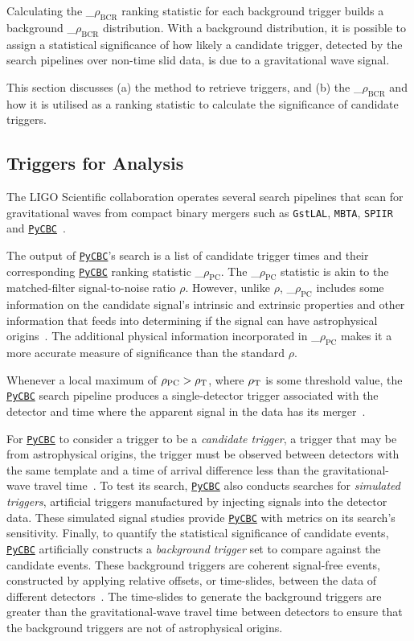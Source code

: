 \documentclass[%
 nofootinbib,
 amsmath,amssymb,
 aps,
 twocolumn
]{revtex4-2}
\newcommand{\pycbc}{{\sc \href{https://pycbc.org/}{\texttt{PyCBC}}}\xspace}
\newcommand{\mathcmd}[1]{{\sc \relax\ifmmode#1\else $#1$\fi}\xspace}
\newcommand{\bcr}{\mathcmd{\rho_\text{BCR}}}
\newcommand{\pycbcstat}{\mathcmd{\rho_\text{PC}}}
\newcommand{\snr}{\mathcmd{\rho}}
\begin{document}

Calculating the \bcr ranking statistic for each background trigger builds a background \bcr distribution. With a background distribution,  it is possible to assign a statistical significance of how likely a candidate trigger, detected by the search pipelines over non-time slid data, is due to a gravitational wave signal. 

This section discusses (a) the method to retrieve triggers, and (b) the \bcr and how it is utilised as a ranking statistic to calculate the significance of candidate triggers.


\subsection{Triggers for Analysis}

The LIGO Scientific collaboration operates several search pipelines that scan for gravitational waves from compact binary mergers such as \texttt{GstLAL}, \texttt{MBTA}, \texttt{SPIIR} and \pycbc~\cite{GWTC1}.

The output of \pycbc's search is a list of candidate trigger times and their corresponding \pycbc ranking statistic \pycbcstat. The \pycbcstat statistic is akin to the matched-filter signal-to-noise ratio \snr. However, unlike \snr, \pycbcstat includes some information on the candidate signal's intrinsic and extrinsic properties and other information that feeds into determining if the signal can have astrophysical origins~\cite{pycbc_og6}. The additional physical information incorporated in \pycbcstat makes it a more accurate measure of significance than the standard \snr. 

Whenever a local maximum of $\pycbcstat > \snr_\text{T}$, where $\snr_\text{T}$ is some threshold value, the \pycbc search pipeline produces a single-detector trigger associated with the detector and time where the apparent signal in the data has its merger~\cite{pycbc_og6}.

For \pycbc to consider a trigger to be a \textit{candidate trigger}, a trigger that may be from astrophysical origins, the trigger must be observed between detectors with the same template and a time of arrival difference less than the gravitational-wave travel time~\cite{pycbc_og1}. To test its search, \pycbc also conducts searches for \textit{simulated triggers}, artificial triggers manufactured by injecting signals into the detector data. These simulated signal studies provide \pycbc with metrics on its search's sensitivity. Finally, to quantify the statistical significance of candidate events, \pycbc artificially constructs a \textit{background trigger} set to compare against the candidate events. These background triggers are coherent signal-free events, constructed by applying relative offsets, or time-slides, between the data of different detectors~\cite{pycbc_og6}. The time-slides to generate the background triggers are greater than the gravitational-wave travel time between detectors to ensure that the background triggers are not of astrophysical origins. 
\end{document}
